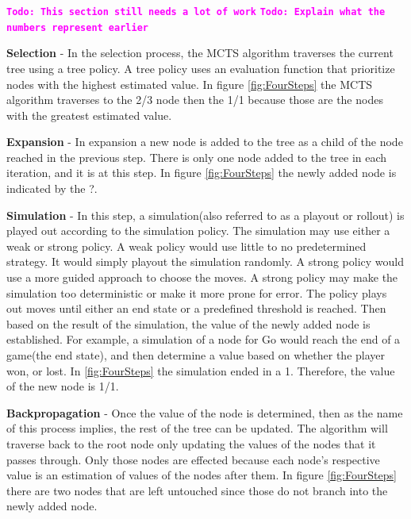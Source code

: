 \documentclass{sig-alternate}
\newcommand{\comment}[1]{{\bf \tt  {#1}}}
\newcommand{\todo}[1]{\textcolor{magenta}{\comment{Todo: {#1}}}}
\begin{document}
\todo{This section still needs a lot of work}
\todo{Explain what the numbers represent earlier}

\textbf{Selection} - In the selection process, the MCTS algorithm traverses the current tree using a tree policy. A tree policy uses an evaluation function that prioritize nodes with the highest estimated value. In figure \ref{fig:FourSteps} the MCTS algorithm traverses to the 2/3 node then the 1/1 because those are the nodes with the greatest estimated value.

\textbf{Expansion} - In expansion a new node is added to the tree as a child of the node reached in the previous step. There is only one node added to the tree in each iteration, and it is at this step. In figure \ref{fig:FourSteps} the newly added node is indicated by the ?.

\textbf{Simulation} - In this step, a simulation(also referred to as a playout or rollout) is played out according to the simulation policy\cite{ActionSelection}. The simulation may use either a weak or strong policy. A weak policy would use little to no predetermined strategy. It would simply playout the simulation randomly. A strong policy would use a more guided approach to choose the moves. A strong policy may make the simulation too deterministic or make it more prone for error\cite{TheGrandChallenge}. The policy plays out moves until either an end state or a predefined threshold is reached. Then based on the result of the simulation, the value of the newly added node is established. For example, a simulation of a node for Go would reach the end of a game(the end state), and then determine a value based on whether the player won, or lost. In \ref{fig:FourSteps} the simulation ended in a 1. Therefore, the value of the new node is 1/1.

\textbf{Backpropagation} - Once the value of the node is determined, then as the name of this process implies, the rest of the tree can be updated. The algorithm will traverse back to the root node only updating the values of the nodes that it passes through. Only those nodes are effected because each node's respective value is an estimation of values of the nodes after them. In figure \ref{fig:FourSteps} there are two nodes that are left untouched since those do not branch into the newly added node.
\end{document}
